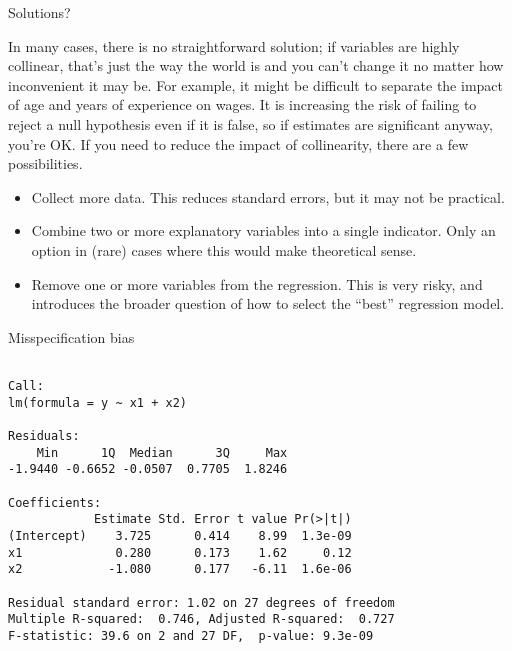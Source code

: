 \documentclass[10pt,ignorenonframetext,]{beamer}
\providecommand{\tightlist}{%
\setlength{\itemsep}{0pt}\setlength{\parskip}{0pt}}
\begin{document}
\begin{frame}{Solutions?}

In many cases, there is no straightforward solution; if variables are
highly collinear, that's just the way the world is and you can't change
it no matter how inconvenient it may be. For example, it might be
difficult to separate the impact of age and years of experience on
wages. It is increasing the risk of failing to reject a null hypothesis
even if it is false, so if estimates are significant anyway, you're OK.
If you need to reduce the impact of collinearity, there are a few
possibilities.

\begin{itemize}
\tightlist
\item
  Collect more data. This reduces standard errors, but it may not be
  practical.
\item
  Combine two or more explanatory variables into a single indicator.
  Only an option in (rare) cases where this would make theoretical
  sense.
\item
  Remove one or more variables from the regression. This is very risky,
  and introduces the broader question of how to select the ``best''
  regression model.
\end{itemize}

\end{frame}

\begin{frame}[fragile]{Misspecification bias}

\begin{verbatim}

Call:
lm(formula = y ~ x1 + x2)

Residuals:
    Min      1Q  Median      3Q     Max
-1.9440 -0.6652 -0.0507  0.7705  1.8246

Coefficients:
            Estimate Std. Error t value Pr(>|t|)
(Intercept)    3.725      0.414    8.99  1.3e-09
x1             0.280      0.173    1.62     0.12
x2            -1.080      0.177   -6.11  1.6e-06

Residual standard error: 1.02 on 27 degrees of freedom
Multiple R-squared:  0.746, Adjusted R-squared:  0.727
F-statistic: 39.6 on 2 and 27 DF,  p-value: 9.3e-09
\end{verbatim}

\end{frame}
\end{document}
